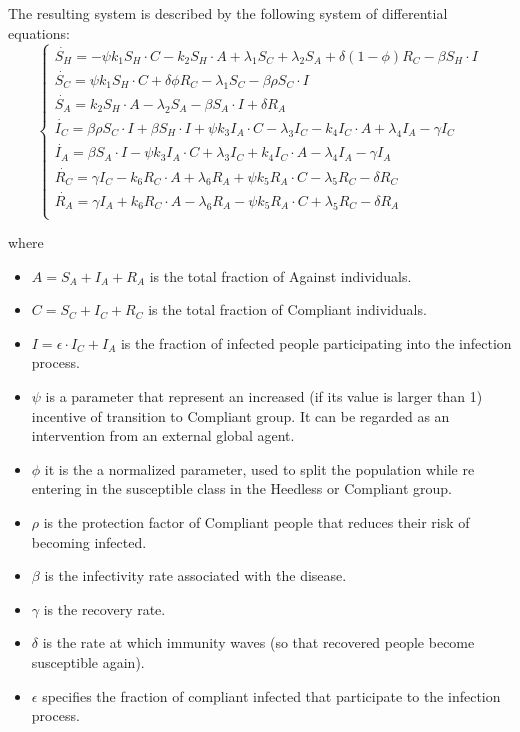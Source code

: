 The resulting system is described by the following system of differential equations: 
\begin{equation}
	\begin{cases}
		\dot{S_H} = - \psi k_1 S_H \cdot C - k_2 S_H \cdot A + \lambda_1 S_C + \lambda_2 S_A + \delta(1-\phi)R_C - \beta S_H \cdot I\\
		\dot{S_C} = \psi k_1 S_H \cdot C + \delta \phi R_C - \lambda_1 S_C - \beta \rho S_C \cdot I  \\
		\dot{S_A} = k_2 S_H \cdot A - \lambda_2 S_A - \beta S_A \cdot I + \delta R_A \\
		\dot{I_C} = \beta \rho S_C \cdot I + \beta S_H \cdot I + \psi k_3 I_A \cdot C - \lambda_3 I_C -  k_4 I_C \cdot A + \lambda_4 I_A - \gamma I_C\\
		 \dot{I_A} = \beta S_A \cdot I - \psi k_3 I_A \cdot C + \lambda_3 I_C + k_4 I_C \cdot A - \lambda_4 I_A - \gamma I_A\\
		 \dot{R_C} = \gamma I_C - k_6 R_C \cdot A + \lambda_6 R_A + \psi k_5 R_A \cdot C - \lambda_5 R_C - \delta R_C\\
		 \dot{R_A} = \gamma I_A + k_6 R_C \cdot A - \lambda_6 R_A - \psi k_5 R_A \cdot C + \lambda_5 R_C - \delta R_A\\
	\end{cases}
	\label{eq:epi_behavioural_eq}
\end{equation}

where
\begin{itemize}
	\item $A = S_A + I_A + R_A$ is the total fraction of Against individuals.
	\item $C = S_C + I_C + R_C$  is the total fraction of Compliant individuals.
	\item $I = \epsilon \cdot I_C + I_A$ is the fraction of infected people participating into the infection process.
	\item $\psi$ is a parameter that represent an increased (if its value is larger than 1) incentive of transition to Compliant group. It can be regarded as an intervention from an external global agent.
	\item $\phi$ it is the  a normalized parameter, used to split the population while re entering in the susceptible class in the Heedless or Compliant group. 
	\item $\rho$ is the protection factor of Compliant people that reduces their risk of becoming infected.
	\item $\beta$ is the infectivity rate associated with the disease.
	\item $\gamma$ is the recovery rate.
	\item $\delta$ is the rate at which immunity waves (so that recovered people become susceptible again).
	\item $\epsilon$ specifies the fraction of compliant infected that participate to the infection process.
\end{itemize}

